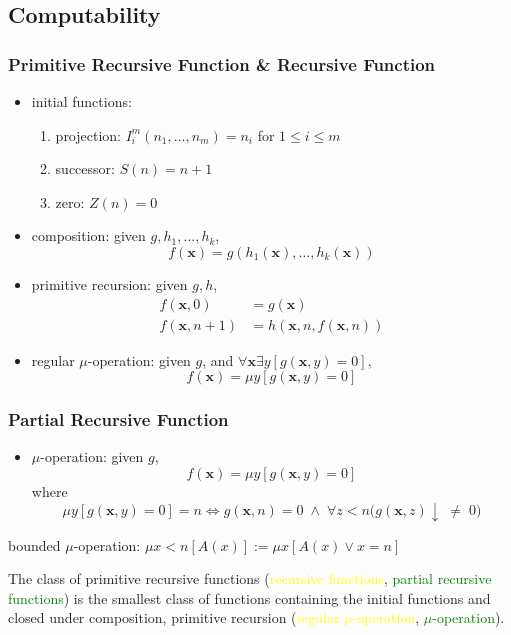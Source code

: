 \documentclass[UTF8,aspectratio=43,11pt,colorlinks,compress,openany]{beamer}%
\begin{document}
\subsection{Computability}

\begin{frame}\frametitle{Primitive Recursive Function \& Recursive Function}
	\begin{itemize}
		\item initial functions:
		\begin{enumerate}
			\item projection: $I_i^m(n_1,\dots,n_m)=n_i$ for $1\leq i\leq m$
			\item successor: $S(n)=n+1$
			\item zero: $Z(n)=0$
		\end{enumerate}
		\item composition: given $g,h_1,\dots,h_k$,
		\[f(\mathbf{x})=g\left(h_1(\mathbf{x}),\dots,h_k(\mathbf{x})\right)\]
		\item primitive recursion: given $g,h$,
		\begin{align*}
		f(\mathbf{x},0)&=g(\mathbf{x})\\
		f(\mathbf{x},n+1)&=h\left(\mathbf{x},n,f(\mathbf{x},n)\right)
		\end{align*}
		\item regular $\mu$-operation: given $g$, and $\forall \mathbf{x}\exists y[g(\mathbf{x},y)=0]$,
		\[f(\mathbf{x})=\mu y[g(\mathbf{x},y)=0]\]
	\end{itemize}
\end{frame}

\begin{frame}\frametitle{Partial Recursive Function}
	\begin{itemize}
		\item $\mu$-operation: given $g$,
		\[f(\mathbf{x})=\mu y\left[g(\mathbf{x},y)=0\right]\]
		where
		\[\mu y\left[g(\mathbf{x},y)=0\right]=n\iff g(\mathbf{x},n)=0\;\wedge\;\forall z<n\big(g(\mathbf{x},z)\!\downarrow\;\ne\;0\big)\]
	\end{itemize}
	bounded $\mu$-operation: $\mu x<n[A(x)]:=\mu x[A(x)\vee x=n]$
	\begin{definition}
		The class of primitive recursive functions (\textcolor{yellow}{recursive functions}, \textcolor{green}{partial recursive functions}) is the smallest class of functions containing the initial functions and closed under composition, primitive recursion (\textcolor{yellow}{regular $\mu$-operation}, \textcolor{green}{$\mu$-operation}).
	\end{definition}
\end{frame}
\end{document}
